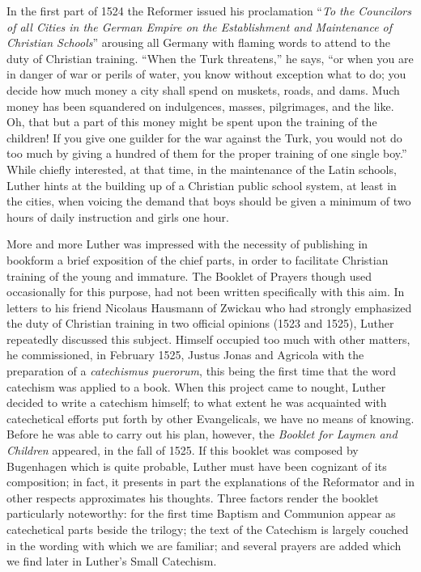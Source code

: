 In the first part of 1524 the Reformer issued his proclamation “\emph{To the Councilors of all Cities in the German Empire on the Establishment and Maintenance of Christian Schools}” arousing all Germany with flaming words to attend to the duty of Christian training. “When the Turk threatens,” he says, “or when you are in danger of war or perils of water, you know without exception what to do; you decide how much money a city shall spend on muskets, roads, and dams. Much money has been squandered on indulgences, masses, pilgrimages, and the like. Oh, that but a part of this money might be spent upon the training of the children! If you give one guilder for the war against the Turk, you would not do too much by giving a hundred of them for the proper training of one single boy.” While chiefly interested, at that time, in the maintenance of the Latin schools, Luther hints at the building up of a Christian public school system, at least in the cities, when voicing the demand that boys should be given a minimum of two hours of daily instruction and girls one hour.

More and more Luther was impressed with the necessity of publishing in bookform a brief exposition of the chief parts, in order to facilitate Christian training of the young and immature. The Booklet of Prayers though used occasionally for this purpose, had not been written specifically with this aim. In letters to his friend Nicolaus Hausmann of Zwickau who had strongly emphasized the duty of Christian training in two official opinions (1523 and 1525), Luther repeatedly discussed this subject. Himself occupied too much with other matters, he commissioned, in February 1525, Justus Jonas and Agricola with the preparation of a \emph{catechismus puerorum}, this being the first time that the word catechism was applied to a book. When this project came to nought, Luther decided to write a catechism himself; to what extent he was acquainted with catechetical efforts put forth by other
Evangelicals, we have no means of knowing. Before he was able to carry out his plan, however, the \emph{Booklet for Laymen and Children} appeared, in the fall of 1525. If this booklet was composed by Bugenhagen which is quite probable, Luther must have been cognizant of its composition; in fact, it presents in part the explanations of the Reformator and in other respects approximates his thoughts. Three factors render the booklet particularly noteworthy: for the first time Baptism and Communion appear as catechetical parts beside the trilogy; the text of the Catechism is largely couched in the wording with which we are familiar; and several prayers are added which we find later in Luther’s Small Catechism.

